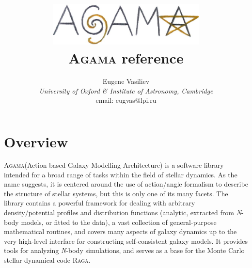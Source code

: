\documentclass[12pt]{article}
\newcommand{\Agama}{\textsc{Agama}\xspace}
\newcommand{\Raga} {\textsc{Raga}\xspace}
\newcommand{\Nbody}{\textsl{N}-body\xspace}
\begin{document}
\title{\vspace*{-10mm}
\includegraphics[width=8cm]{agama.jpg}\protect\\[5mm]\Agama reference}
\author{Eugene Vasiliev\\
\normalsize\textit{University of Oxford \& Institute of Astronomy, Cambridge}\\
\normalsize\textrm{email: eugvas@lpi.ru} }

\maketitle
\tableofcontents
\newpage

\section{Overview}

\Agama (Action-based Galaxy Modelling Architecture) is a software library intended for a broad range of tasks within the field of stellar dynamics. As the name suggests, it is centered around the use of action/angle formalism to describe the structure of stellar systems, but this is only one of its many facets. The library contains a powerful framework for dealing with arbitrary density/potential profiles and distribution functions (analytic, extracted from \Nbody models, or fitted to the data), a vast collection of general-purpose mathematical routines, and covers many aspects of galaxy dynamics up to the very high-level interface for constructing self-consistent galaxy models. It provides tools for analyzing \Nbody simulations, and serves as a base for the Monte Carlo stellar-dynamical code \Raga.
\end{document}
